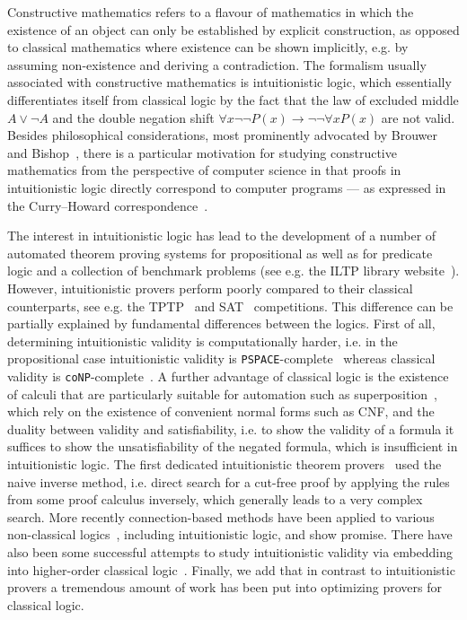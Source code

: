 \documentclass[runningheads]{llncs}
\begin{document}
Constructive mathematics refers to a flavour of mathematics in which the existence of an object can only be established by explicit construction, as opposed to classical mathematics where existence can be shown implicitly, e.g. by assuming non-existence and deriving a contradiction.
The formalism usually associated with constructive mathematics is intuitionistic logic, which essentially differentiates itself from classical logic by the fact that the law of excluded middle $A\vee\neg A$ and the double negation shift $\forall x\neg\neg P(x)\to\neg\neg\forall xP(x)$ are not valid.
Besides philosophical considerations, most prominently advocated by Brouwer~\cite{brouwer1907over} and Bishop~\cite{bishop1967foundations}, there is a particular motivation for studying constructive mathematics from the perspective of computer science in that proofs in  intuitionistic logic directly correspond to computer programs --- as expressed in the Curry--Howard correspondence~\cite{howard1980formulae}.

The interest in intuitionistic logic has lead to the development of a number of automated theorem proving systems for propositional as well as for predicate logic and a collection of benchmark problems (see e.g. the ILTP library website~\cite{iltp}).
However, intuitionistic provers perform poorly compared to their classical counterparts, see e.g. the TPTP~\cite{casc} and SAT~\cite{satc} competitions.
This difference can be partially explained by fundamental differences between the logics.
First of all, determining intuitionistic validity is computationally harder, i.e. in the propositional case intuitionistic validity is \verb+PSPACE+-complete~\cite{statman1979intuitionistic} whereas classical validity is \verb+coNP+-complete~\cite{cook1971complexity}.
A further advantage of classical logic is the existence of calculi that are particularly suitable for automation such as superposition~\cite{bachmair2001resolution}, which rely on the existence of convenient normal forms such as CNF, and the duality between validity and satisfiability, i.e. to show the validity of a formula it suffices to show the unsatisfiability of the negated formula, which is insufficient in intuitionistic logic.
The first dedicated intuitionistic theorem provers~\cite{mclaughlin2009efficient,tammet1996resolution} used the naive inverse method, i.e. direct search for a cut-free proof by applying the rules from some proof calculus inversely, which generally leads to a very complex search. More recently connection-based methods have been applied to various non-classical logics~\cite{otten2005clausal,otten2021nanocop}, including intuitionistic logic, and show promise.
There have also been some successful attempts to study intuitionistic validity via embedding into higher-order classical logic~\cite{LEO}.
Finally, we add that in contrast to intuitionistic provers a tremendous amount of work has been put into optimizing provers for classical logic.
\end{document}
